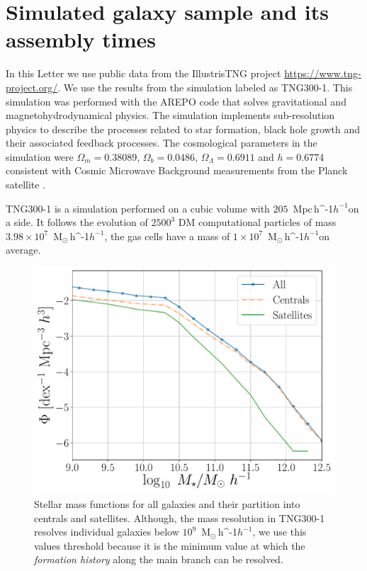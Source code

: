 \documentclass[fleqn,usenatbib]{mnras}
\newcommand{\Msunh}{\,{\rm M}$_{\odot}$\,\ifmmode h^{-1}\else $h^{-1}$\fi}
\newcommand{\Mpch}{\,{\rm Mpc}\,\ifmmode h^{-1}\else $h^{-1}$\fi}
\begin{document}
\section{Simulated galaxy sample and its assembly times}
\label{sec:simul} %

In this Letter we use public data from the IllustrisTNG project
\url{https://www.tng-project.org/}. 
We use the results from the simulation labeled as TNG300-1.
This simulation was performed with the AREPO code
\citep{2018MNRAS.473.4077P} that solves gravitational and
magnetohydrodynamical physics.
The simulation implements sub-resolution physics to describe the
processes related to star formation, black hole growth and their
associated feedback processes.
The cosmological parameters in the simulation were $\Omega_m=0.38089$,
$\Omega_b=0.0486$, $\Omega_\Lambda= 0.6911$ and $h=0.6774$ consistent
with Cosmic Microwave Background measurements from the Planck satellite
\citep{2016A&A...594A..13P}.  

TNG300-1 is a simulation performed on a cubic volume
with  $205$ \Mpch on a side.
It follows the evolution of $2500^3$ DM computational particles of
mass $3.98 \times 10^7$ \Msunh, the gas cells have a mass of $1
\times 10^7$ \Msunh on average.



\begin{figure}
    \centering
    \includegraphics[width=1\columnwidth]{figuras/Histogramas.pdf}
    \caption{Stellar mass functions for all galaxies and their partition
      into centrals and satellites. 
    Although, the mass resolution in TNG300-1 resolves individual
    galaxies below $10^{9}$ \Msunh, we use this values threshold because
    it is the minimum value at which the \emph{formation history}
    along the main branch can be resolved.}
    \label{fig:stellar_fuction}
\end{figure}
\end{document}
